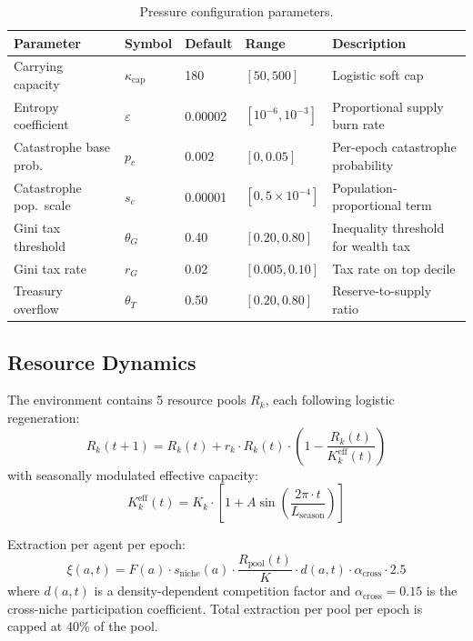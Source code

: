 \documentclass[11pt,a4paper]{article}
\begin{document}
\begin{table}[H]
\centering
\caption{Pressure configuration parameters.}
\small
\begin{tabular}{@{}lllll@{}}
\toprule
Parameter & Symbol & Default & Range & Description \\
\midrule
Carrying capacity & $\kappa_{\text{cap}}$ & 180 & $[50, 500]$ & Logistic soft cap \\
Entropy coefficient & $\varepsilon$ & 0.00002 & $[10^{-6}, 10^{-3}]$ & Proportional supply burn rate \\
Catastrophe base prob.\ & $p_c$ & 0.002 & $[0, 0.05]$ & Per-epoch catastrophe probability \\
Catastrophe pop.\ scale & $s_c$ & 0.00001 & $[0, 5{\times}10^{-4}]$ & Population-proportional term \\
Gini tax threshold & $\theta_G$ & 0.40 & $[0.20, 0.80]$ & Inequality threshold for wealth tax \\
Gini tax rate & $r_G$ & 0.02 & $[0.005, 0.10]$ & Tax rate on top decile \\
Treasury overflow & $\theta_T$ & 0.50 & $[0.20, 0.80]$ & Reserve-to-supply ratio \\
\bottomrule
\end{tabular}
\end{table}

\subsection{Resource Dynamics}

The environment contains 5 resource pools $R_k$, each following logistic regeneration:
\begin{equation}
  R_k(t+1) = R_k(t) + r_k \cdot R_k(t) \cdot \left(1 - \frac{R_k(t)}{K_k^{\text{eff}}(t)}\right)
\end{equation}
with seasonally modulated effective capacity:
\begin{equation}
  K_k^{\text{eff}}(t) = K_k \cdot \left[1 + A \sin\!\left(\frac{2\pi \cdot t}{L_{\text{season}}}\right)\right]
\end{equation}

Extraction per agent per epoch:
\begin{equation}
  \xi(a, t) = F(a) \cdot s_{\text{niche}}(a) \cdot \frac{R_{\text{pool}}(t)}{K} \cdot d(a, t) \cdot \alpha_{\text{cross}} \cdot 2.5
\end{equation}
where $d(a, t)$ is a density-dependent competition factor and $\alpha_{\text{cross}} = 0.15$ is the cross-niche participation coefficient. Total extraction per pool per epoch is capped at 40\% of the pool.
\end{document}
